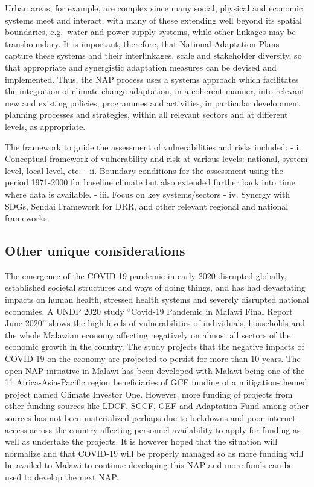 \documentclass[
]{book}
\begin{document}
Urban areas, for example, are complex since many social, physical and economic systems meet and interact, with many of these extending well beyond its spatial
boundaries, e.g.~water and power supply systems, while other linkages may be transboundary. It is important, therefore, that National Adaptation Plans capture
these systems and their interlinkages, scale and stakeholder diversity, so that appropriate and synergistic adaptation measures can be devised and implemented.
Thus, the NAP process uses a systems approach which facilitates the integration of climate change adaptation, in a coherent manner, into relevant new and
existing policies, programmes and activities, in particular development planning processes and strategies, within all relevant sectors and at different levels,
as appropriate.

The framework to guide the assessment of vulnerabilities and risks included:
- i. Conceptual framework of vulnerability and risk at various levels: national, system level, local level, etc.
- ii. Boundary conditions for the assessment using the period 1971-2000 for baseline climate but also extended further back into time where data is
available.
- iii. Focus on key systems/sectors
- iv. Synergy with SDGs, Sendai Framework for DRR, and other relevant regional and national frameworks.

\hypertarget{other-unique-considerations}{%
\subsection{Other unique considerations}\label{other-unique-considerations}}

The emergence of the COVID-19 pandemic in early 2020 disrupted globally, established societal structures and ways of doing things, and has had devastating
impacts on human health, stressed health systems and severely disrupted national economies. A UNDP 2020 study ``Covid-19 Pandemic in Malawi Final Report June
2020'' shows the high levels of vulnerabilities of individuals, households and the whole Malawian economy affecting negatively on almost all sectors of the
economic growth in the country. The study projects that the negative impacts of COVID-19 on the economy are projected to persist for more than 10 years. The open
NAP initiative in Malawi has been developed with Malawi being one of the 11 Africa-Asia-Pacific region beneficiaries of GCF funding of a mitigation-themed
project named Climate Investor One. However, more funding of projects from other funding sources like LDCF, SCCF, GEF and Adaptation Fund among other sources has
not been materialized perhaps due to lockdowns and poor internet access across the country affecting personnel availability to apply for funding as well as
undertake the projects. It is however hoped that the situation will normalize and that COVID-19 will be properly managed so as more funding will be availed to
Malawi to continue developing this NAP and more funds can be used to develop the next NAP.
\end{document}
